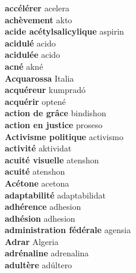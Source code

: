 \textbf{ accélérer  } acelera \\
\textbf{ achèvement  } akto \\
\textbf{ acide acétylsalicylique  } aspirin \\
\textbf{ acidulé  } acido \\
\textbf{ acidulée  } acido \\
\textbf{ acné  } akné \\
\textbf{ Acquarossa  } Italia \\
\textbf{ acquéreur  } kumpradó \\
\textbf{ acquérir  } optené \\
\textbf{ action de grâce  } bindishon \\
\textbf{ action en justice  } proseso \\
\textbf{ Activisme politique  } activismo \\
\textbf{ activité  } aktividat \\
\textbf{ acuité visuelle  } atenshon \\
\textbf{ acuité  } atenshon \\
\textbf{ Acétone  } acetona \\
\textbf{ adaptabilité  } adaptabilidat \\
\textbf{ adhérence  } adhesion \\
\textbf{ adhésion  } adhesion \\
\textbf{ administration fédérale  } agensia \\
\textbf{ Adrar  } Algeria \\
\textbf{ adrénaline  } adrenalina \\
\textbf{ adultère  } adúltero \\
